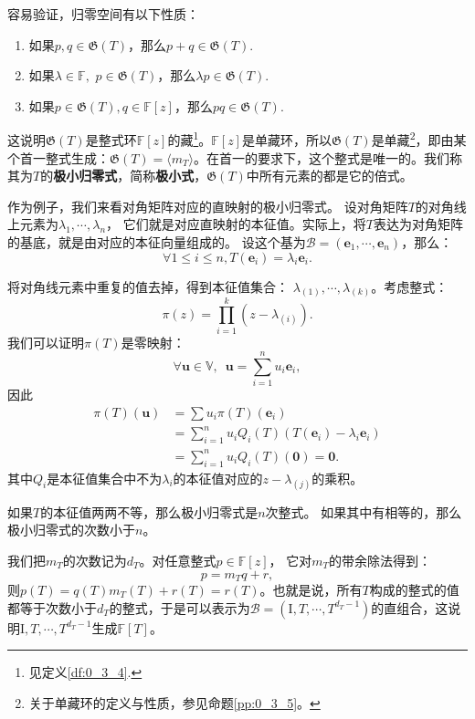\documentclass[12pt,UTF8]{ctexbook}
\begin{document}
容易验证，归零空间有以下性质：
\begin{enumerate}
    \item 如果$p, q \in \mathfrak{G}(T)$，那么$p + q \in \mathfrak{G}(T).$
    \item 如果$\lambda \in \mathbb{F}, \,\, p \in \mathfrak{G}(T)$，那么$\lambda p \in \mathfrak{G}(T).$
    \item 如果$p \in \mathfrak{G}(T), q \in \mathbb{F}[z]$，那么$pq \in \mathfrak{G}(T).$
\end{enumerate}
这说明$\mathfrak{G}(T)$是整式环$\mathbb{F}[z]$的藏\footnote{见定义\ref{df:0_3_4}.}。$\mathbb{F}[z]$是单藏环，所以$\mathfrak{G}(T)$是单藏\footnote{关于单藏环的定义与性质，参见命题\ref{pp:0_3_5}。}，即由某个首一整式生成：$\mathfrak{G}(T) = \langle m_T \rangle$。在首一的要求下，这个整式是唯一的。我们称其为$T$的\textbf{极小归零式}，简称\textbf{极小式}，$\mathfrak{G}(T)$中所有元素的都是它的倍式。

作为例子，我们来看对角矩阵对应的直映射的极小归零式。
设对角矩阵$T$的对角线上元素为$\lambda_1, \cdots , \lambda_n$，
它们就是对应直映射的本征值。实际上，将$T$表达为对角矩阵的基底，就是由对应的本征向量组成的。
设这个基为$\mathcal{B} = (\mathbf{e}_1, \cdots, \mathbf{e}_n)$，那么：
$$ \forall 1 \leqslant i \leqslant n, T(\mathbf{e}_i) = \lambda_i \mathbf{e}_i. $$

将对角线元素中重复的值去掉，得到本征值集合：
$\lambda_{(1)}, \cdots , \lambda_{(k)}$。考虑整式：
$$ \pi(z) = \prod_{i=1}^k (z - \lambda_{(i)}).$$
我们可以证明$\pi(T)$是零映射：
$$ \forall \mathbf{u} \in \mathbb{V}, \,\,\, \mathbf{u} = \sum_{i=1}^n u_i \mathbf{e}_i, $$
因此
\begin{align*}
     \pi(T)(\mathbf{u}) &= \sum u_i \pi(T) (\mathbf{e}_i)  \\
     &= \sum_{i=1}^n u_i Q_i(T) (T(\mathbf{e}_i) - \lambda_i \mathbf{e}_i)  \\
     &= \sum_{i=1}^n u_i Q_i(T) (\mathbf{0}) = \mathbf{0}.  
\end{align*}
其中$Q_i$是本征值集合中不为$\lambda_i$的本征值对应的$z - \lambda_{(j)}$的乘积。

如果$T$的本征值两两不等，那么极小归零式是$n$次整式。
如果其中有相等的，那么极小归零式的次数小于$n$。

我们把$m_T$的次数记为$d_T$。对任意整式$p\in\mathbb{F}[z]$，
它对$m_T$的带余除法得到：
$$p = m_T q + r,$$
则$p(T) = q(T)m_T(T) + r(T) = r(T)$。也就是说，所有$T$构成的整式的值都等于次数小于$d_T$的整式，于是可以表示为$\mathcal{B} = (\mathrm{I}, T, \cdots , T^{d_T - 1})$的直组合，这说明$\mathrm{I}, T, \cdots , T^{d_T - 1}$生成$\mathbb{F}[T]$。
\end{document}
